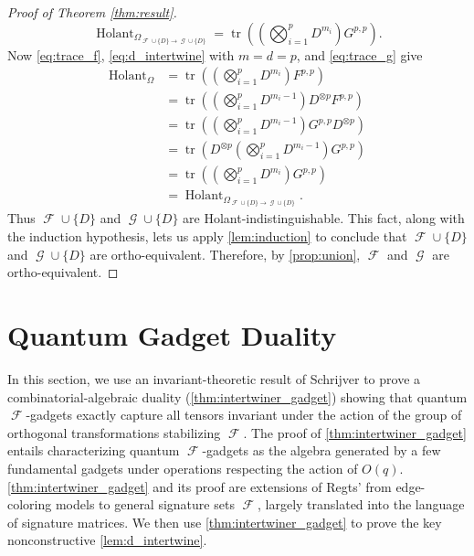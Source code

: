 \documentclass{article}
\DeclareMathOperator{\tr}{tr}
\DeclareMathOperator{\fc}{\mathcal{F}}
\DeclareMathOperator{\gc}{\mathcal{G}}
\DeclareMathOperator{\holant}{Holant}
\begin{document}
\begin{proof}[Proof of Theorem \ref{thm:result}]
\begin{equation}
        \holant_{\Omega_{\fc\cup\{D\}\to\gc\cup\{D\}}}
        = \tr\left(\left(\bigotimes_{i=1}^p D^{m_i}\right) G^{p,p}\right).
    \end{equation}
    Now \eqref{eq:trace_f}, \eqref{eq:d_intertwine} with $m=d=p$, and \eqref{eq:trace_g} 
    give
    \begin{align*}
        \holant_{\Omega}
        &= \tr\left(\left(\bigotimes_{i=1}^p D^{m_i}\right) F^{p,p}\right) \\
        &= \tr\left(\left(\bigotimes_{i=1}^p D^{m_i-1}\right) D^{\otimes p}  F^{p,p}\right) \\
        &= \tr\left(\left(\bigotimes_{i=1}^p D^{m_i-1}\right) G^{p,p} D^{\otimes p}\right) \\
        &= \tr\left(D^{\otimes p}\left(\bigotimes_{i=1}^p D^{m_i-1}\right) G^{p,p} \right) \\
        &= \tr\left(\left(\bigotimes_{i=1}^p D^{m_i}\right) G^{p,p} \right) \\
        &= \holant_{\Omega_{\fc\cup\{D\}\to\gc\cup\{D\}}}.
    \end{align*}
    Thus $\fc \cup \{D\}$ and $\gc \cup \{D\}$ are Holant-indistinguishable. This fact, along with the
    induction hypothesis, lets us apply \autoref{lem:induction} to conclude that $\fc \cup \{D\}$
    and $\gc \cup \{D\}$ are ortho-equivalent. Therefore, by \autoref{prop:union}, $\fc$ and $\gc$
    are ortho-equivalent.
\end{proof} 

\section{Quantum Gadget Duality}
\label{sec:duality}
In this section, we use an invariant-theoretic
result of Schrijver \cite{schrijver_tensor_2008} to prove a
combinatorial-algebraic duality (\autoref{thm:intertwiner_gadget}) showing that
quantum $\fc$-gadgets exactly capture all tensors invariant under the
action of the group of orthogonal transformations stabilizing $\fc$.
The proof of \autoref{thm:intertwiner_gadget} entails characterizing quantum $\fc$-gadgets as 
the algebra generated by a few fundamental gadgets under operations respecting the action 
of $O(q)$. 
\autoref{thm:intertwiner_gadget} and its proof are extensions of Regts' 
\cite[Theorem 3]{regts_rank_2012}
from edge-coloring models to general signature sets $\fc$, largely translated into the language of
signature matrices. We then use \autoref{thm:intertwiner_gadget} to prove the key 
nonconstructive \autoref{lem:d_intertwine}.
\end{document}
